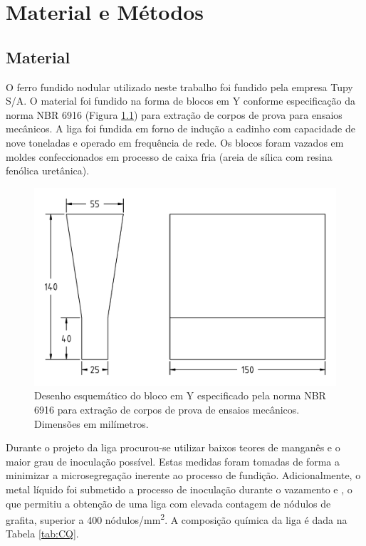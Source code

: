 \chapter{Material e Métodos}

\section{Material}

O ferro fundido nodular utilizado neste trabalho foi fundido pela empresa Tupy S/A. O material foi fundido na forma de blocos em Y conforme especificação da norma NBR 6916 (Figura \ref{fig:nbr6916}) para extração de corpos de prova para ensaios mecânicos. A liga foi fundida em forno de indução a cadinho com capacidade de nove toneladas e operado em frequência de rede. Os blocos foram vazados em moldes confeccionados em processo de caixa fria (areia de sílica com resina fenólica uretânica).

\begin{figure}
  \includegraphics[width=12cm]{img/nbr6916.pdf}
  \caption{Desenho esquemático do bloco em Y especificado pela norma NBR 6916 para extração de corpos de prova de ensaios mecânicos. Dimensões em milímetros.}
  \label{fig:nbr6916}
\end{figure}

Durante o projeto da liga procurou-se utilizar baixos teores de manganês e o maior grau de inoculação possível. Estas medidas foram tomadas de forma a minimizar a microsegregação inerente ao processo de fundição. Adicionalmente, o metal líquido foi submetido a processo de inoculação durante o vazamento e , o que permitiu a obtenção de uma liga com elevada contagem de nódulos de grafita, superior a 400 nódulos/mm\textsuperscript{2}. A composição química da liga é dada na Tabela \ref{tab:CQ}. %

